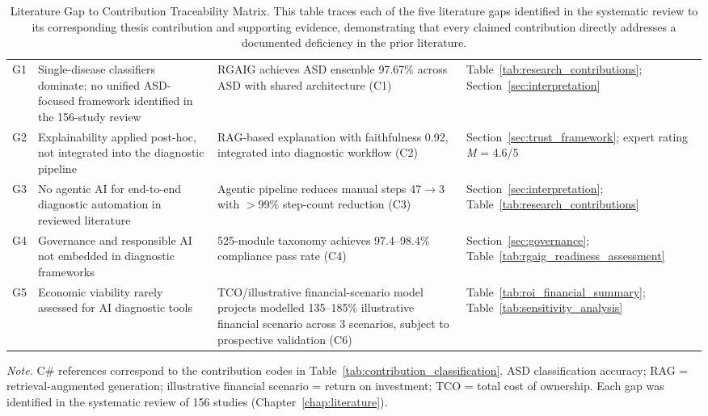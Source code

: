 \begin{table}[H]
\tablestripes\tablefontsize
\tablefontsize
\caption[Literature Gap to Contribution Traceability Matrix]{Literature Gap to Contribution Traceability Matrix. This table traces each of the five literature gaps identified in the systematic review to its corresponding thesis contribution and supporting evidence, demonstrating that every claimed contribution directly addresses a documented deficiency in the prior literature.}
\begin{tabularx}{\textwidth}{@{} c L L L @{}}
\toprule
{} &  &  &  \\
\midrule
G1 & Single-disease classifiers dominate; no unified ASD-focused framework identified in the 156-study review & RGAIG achieves ASD ensemble 97.67\% across ASD with shared architecture (C1) & Table~\ref{tab:research_contributions}; Section~\ref{sec:interpretation} \\
\addlinespace
G2 & Explainability applied post-hoc, not integrated into the diagnostic pipeline & RAG-based explanation with faithfulness 0.92, integrated into diagnostic workflow (C2) & Section~\ref{sec:trust_framework}; expert rating \textit{M} = 4.6/5 \\
\addlinespace
G3 & No agentic AI for end-to-end diagnostic automation in reviewed literature & Agentic pipeline reduces manual steps 47$\to$3 with $>$99\% step-count reduction (C3) & Section~\ref{sec:interpretation}; Table~\ref{tab:research_contributions} \\
\addlinespace
G4 & Governance and responsible AI not embedded in diagnostic frameworks & 525-module taxonomy achieves 97.4--98.4\% compliance pass rate (C4) & Section~\ref{sec:governance}; Table~\ref{tab:rgaig_readiness_assessment} \\
\addlinespace
G5 & Economic viability rarely assessed for AI diagnostic tools & TCO/illustrative financial-scenario model projects modelled 135--185\% illustrative financial scenario across 3 scenarios, subject to prospective validation (C6) & Table~\ref{tab:roi_financial_summary}; Table~\ref{tab:sensitivity_analysis} \\
\bottomrule
\end{tabularx}
\vspace{0.5em}\noindent\textit{Note.} C\# references correspond to the contribution codes in Table~\ref{tab:contribution_classification}. ASD classification accuracy; RAG = retrieval-augmented generation; illustrative financial scenario = return on investment; TCO = total cost of ownership. Each gap was identified in the systematic review of 156 studies (Chapter~\ref{chap:literature}).
\end{table}

